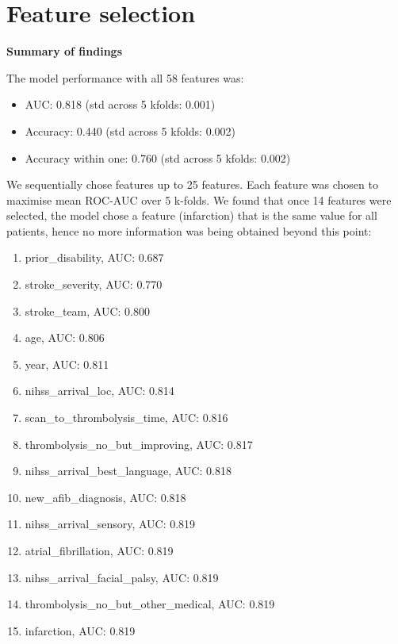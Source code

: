\clearpage
\newpage

\section{Feature selection}

\textbf{Summary of findings}

The model performance with all 58 features was:

\begin{itemize}
    \item AUC: 0.818 (std across 5 kfolds: 0.001)
    \item Accuracy: 0.440 (std across 5 kfolds: 0.002)
    \item Accuracy within one: 0.760 (std across 5 kfolds: 0.002)

\end{itemize}

We sequentially chose features up to 25 features. Each feature was chosen to maximise mean ROC-AUC over 5 k-folds. We found that once 14 features were selected, the model chose a feature (infarction) that is the same value for all patients, hence no more information was being obtained beyond this point:

\begin{enumerate}
    \item prior\_disability, AUC: 0.687
    \item stroke\_severity, AUC: 0.770
    \item stroke\_team, AUC: 0.800
    \item age, AUC: 0.806
    \item year, AUC: 0.811
    \item nihss\_arrival\_loc, AUC: 0.814
    \item scan\_to\_thrombolysis\_time, AUC: 0.816
    \item thrombolysis\_no\_but\_improving, AUC: 0.817
    \item nihss\_arrival\_best\_language, AUC: 0.818
    \item new\_afib\_diagnosis, AUC: 0.818
    \item nihss\_arrival\_sensory, AUC: 0.819
    \item atrial\_fibrillation, AUC: 0.819
    \item nihss\_arrival\_facial\_palsy, AUC: 0.819
    \item thrombolysis\_no\_but\_other\_medical, AUC: 0.819
    \item infarction, AUC: 0.819
\end{enumerate}

